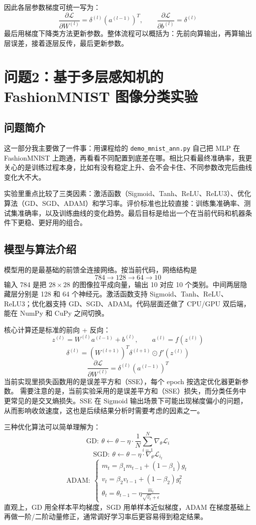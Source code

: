 \documentclass[a4paper,10pt,twocolumn]{article}
\begin{document}
因此各层参数梯度可统一写为：
\[
\frac{\partial \mathcal{L}}{\partial W^{(l)}} = \delta^{(l)}\left(a^{(l-1)}\right)^T,
\qquad
\frac{\partial \mathcal{L}}{\partial b^{(l)}} = \delta^{(l)}
\]
最后用梯度下降类方法更新参数。整体流程可以概括为：先前向算输出，再算输出层误差，接着逐层反传，最后更新参数。

\section{问题2：基于多层感知机的 FashionMNIST 图像分类实验}

\subsection{问题简介}

这一部分我主要做了一件事：用课程给的 \texttt{demo\_mnist\_ann.py} 自己把 MLP 在 FashionMNIST 上跑通，再看看不同配置到底差在哪。相比只看最终准确率，我更关心的是训练过程本身，比如有没有稳定上升、会不会卡住、不同参数改完后曲线变化大不大。

实验里重点比较了三类因素：激活函数（Sigmoid、Tanh、ReLU、ReLU3）、优化算法（GD、SGD、ADAM）和学习率。评价标准也比较直接：训练集准确率、测试集准确率，以及训练曲线的变化趋势。最后目标是给出一个在当前代码和机器条件下更稳、更好用的组合。

\subsection{模型与算法介绍}

模型用的是最基础的前馈全连接网络。按当前代码，网络结构是
\[
784\rightarrow 128\rightarrow 64\rightarrow 10
\]
输入 784 是把 $28\times 28$ 的图像拉平成向量，输出 10 对应 10 个类别。中间两层隐藏层分别是 128 和 64 个神经元。激活函数支持 Sigmoid、Tanh、ReLU、ReLU3；优化器支持 GD、SGD、ADAM。代码层面还做了 CPU/GPU 双后端，能在 NumPy 和 CuPy 之间切换。

核心计算还是标准的前向 + 反向：
\[
z^{(l)}=W^{(l)}a^{(l-1)}+b^{(l)},\qquad
a^{(l)}=f\!\left(z^{(l)}\right)
\]
\[
\delta^{(l)}=\left(W^{(l+1)}\right)^T\delta^{(l+1)}\odot f'\!\left(z^{(l)}\right)
\]
\[
\frac{\partial \mathcal{L}}{\partial W^{(l)}}=\delta^{(l)}\left(a^{(l-1)}\right)^T
\]
当前实现里损失函数用的是误差平方和（SSE），每个 epoch 按选定优化器更新参数。
需要注意的是，当前实验采用的是误差平方和（SSE）损失，而分类任务中更常见的是交叉熵损失。SSE 在 Sigmoid 输出场景下可能出现梯度偏小的问题，从而影响收敛速度，这也是后续结果分析时需要考虑的因素之一。

三种优化算法可以简单理解为：
\[
\mathrm{GD}:~\theta\leftarrow\theta-\eta\cdot\frac{1}{N}\sum_{i=1}^{N}\nabla_{\theta}\mathcal{L}_i
\]
\[
\mathrm{SGD}:~\theta\leftarrow\theta-\eta\cdot\nabla_{\theta}\mathcal{L}_{i_t}
\]
\[
\mathrm{ADAM}:~
\begin{cases}
m_t=\beta_1 m_{t-1}+(1-\beta_1)g_t\\
v_t=\beta_2 v_{t-1}+(1-\beta_2)g_t^2\\
\theta_t=\theta_{t-1}-\eta\frac{\hat m_t}{\sqrt{\hat v_t}+\epsilon}
\end{cases}
\]
直观上，GD 用全样本平均梯度，SGD 用单样本近似梯度，ADAM 在梯度基础上再做一阶/二阶动量修正，通常调好学习率后更容易得到稳定结果。
\end{document}
